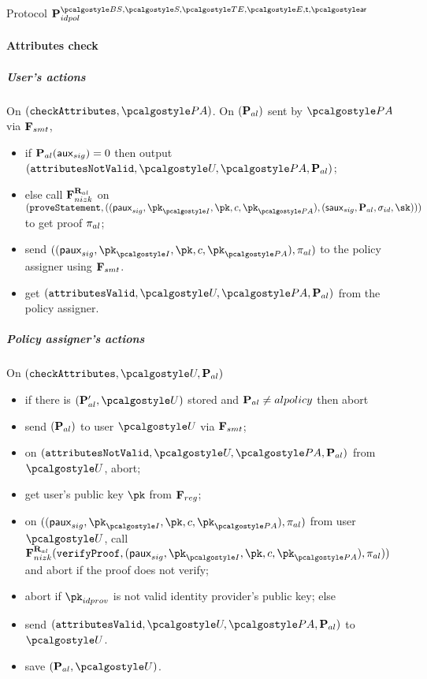 \documentclass[runningheads,10pt]{llncs}
\numberwithin{equation}{section}
\begin{document}
\begin{protbox}{Protocol $\prot{idpol}^{\BSIG, \SIG, \TENC, \ENC, \thresholdar, \noofar}$}
\paragraph{Attributes check}
\subparagraph{User's actions} On
$(\checkAttributes, \polas)$.
On $(\mathbf{P}_{al})$ sent by $\polas$ via $\mathbf{F}_{{smt}}$,
  \begin{itemize}
  \item if $\mathbf{P}_{al} (\mathsf{aux}_{sig}) = 0$ then output $(\attributesNotValid, \user,
    \polas, \alpolicy)$; 
  \item else call $\mathbf{F}_{{nizk}}^{\mathbf{R}_{al}}$ on
    $(\proveStatement, ((\paux_{sig}, \pk_{\idprov}, \pk, c, \pk_{\polas}), (\saux_{sig},
    \alpolicy, \signature_{id}, \sk)))$ to get proof $\mathsf{\pi}_{al}$;
  \item send $((\paux_{sig}, \pk_{\idprov}, \pk, c, \pk_{\polas}), \zkproof_{al})$ to
    the policy assigner using $\mathbf{F}_{{smt}}$.
  \item get $(\attributesValid, \user, \polas, \alpolicy)$ from the policy assigner.
  \end{itemize}

  \subparagraph{Policy assigner's actions}
  On $(\checkAttributes, \user, \alpolicy)$
  \begin{itemize}
  \item if there is $(\alpolicy', \user)$ stored and $\mathbf{P}_{al} \neq alpolicy$ then abort
  \item send $(\mathbf{P}_{al})$ to user $\user$ via $\mathbf{F}_{{smt}}$;
  \item on $(\attributesNotValid, \user, \polas, \alpolicy)$ from $\user$, abort;
  \item get user's public key $\pk$ from $\mathbf{F}_{{reg}}$;
  \item on $((\paux_{sig}, \pk_{\idprov}, \pk, c, \pk_{\polas}), \zkproof_{al})$ from
    user $\user$, call
    $\func{nizk}^{\REL_{al}} (\verifyProof, (\paux_{sig}, \pk_{\idprov}, \pk, c,
      \pk_{\polas}), \zkproof_{al}))$ and abort if the proof does not verify;
  \item abort if $\pk_{idprov}$ is not valid identity provider's public key; else
  \item send $(\attributesValid, \user, \polas, \alpolicy)$ to $\user$.
  \item save $(\alpolicy, \user)$.
  \end{itemize}


\end{protbox}
\end{document}
